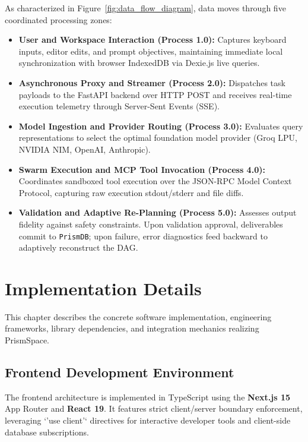 \documentclass[12pt,a4paper]{report}
\begin{document}
As characterized in Figure~\ref{fig:data_flow_diagram}, data moves through five coordinated processing zones:
\begin{itemize}
    \item \textbf{User and Workspace Interaction (Process 1.0):} Captures keyboard inputs, editor edits, and prompt objectives, maintaining immediate local synchronization with browser IndexedDB via Dexie.js live queries.
    \item \textbf{Asynchronous Proxy and Streamer (Process 2.0):} Dispatches task payloads to the FastAPI backend over HTTP POST and receives real-time execution telemetry through Server-Sent Events (SSE).
    \item \textbf{Model Ingestion and Provider Routing (Process 3.0):} Evaluates query representations to select the optimal foundation model provider (Groq LPU, NVIDIA NIM, OpenAI, Anthropic).
    \item \textbf{Swarm Execution and MCP Tool Invocation (Process 4.0):} Coordinates sandboxed tool execution over the JSON-RPC Model Context Protocol, capturing raw execution stdout/stderr and file diffs.
    \item \textbf{Validation and Adaptive Re-Planning (Process 5.0):} Assesses output fidelity against safety constraints. Upon validation approval, deliverables commit to \texttt{PrismDB}; upon failure, error diagnostics feed backward to adaptively reconstruct the DAG.
\end{itemize}

\chapter{Implementation Details}

This chapter describes the concrete software implementation, engineering frameworks, library dependencies, and integration mechanics realizing PrismSpace.

\section{Frontend Development Environment}
The frontend architecture is implemented in TypeScript using the \textbf{Next.js 15} App Router and \textbf{React 19}. It features strict client/server boundary enforcement, leveraging `'use client'` directives for interactive developer tools and client-side database subscriptions.
\end{document}
